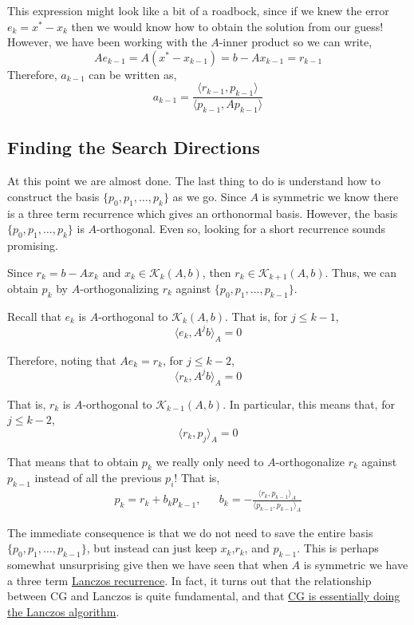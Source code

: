 \documentclass[10pt]{article}
\begin{document}
This expression might look like a bit of a roadbock, since if we knew the error \(e_k = x^* - x_k\) then we would know how to obtain the solution from our guess!
However, we have been working with the \(A\)-inner product so we can write,
\[
Ae_{k-1} = A(x^* - x_{k-1}) = b - Ax_{k-1} = r_{k-1}
\]
Therefore, \(a_{k-1}\) can be written as,
\[
a_{k-1}
= \frac{\langle r_{k-1}, p_{k-1} \rangle}{\langle p_{k-1},A p_{k-1} \rangle} 
\]

\subsection{Finding the Search Directions}

At this point we are almost done.
The last thing to do is understand how to construct the basis \(\{p_0,p_1,\ldots,p_k\}\) as we go.
Since \(A\) is symmetric we know there is a three term recurrence which gives an orthonormal basis. However, the basis \(\{p_0,p_1,\ldots,p_k\}\) is \(A\)-orthogonal.
Even so, looking for a short recurrence sounds promising.

Since \(r_k = b-Ax_k\) and \(x_k\in\mathcal{K}_k(A,b)\), then \(r_k \in \mathcal{K}_{k+1}(A,b)\).
Thus, we can obtain \(p_k\) by \(A\)-orthogonalizing \(r_k\) against \(\{p_0,p_1,\ldots,p_{k-1}\}\).

Recall that \(e_k\) is \(A\)-orthogonal to \(\mathcal{K}_k(A,b)\).
That is, for \(j\leq k-1\),
\[
\langle e_k, A^j b \rangle_A = 0
\]

Therefore, noting that \(Ae_k = r_k\), for \(j\leq k-2\),
\[
\langle r_k, A^j b \rangle_A = 0
\]

That is, \(r_k\) is \(A\)-orthogonal to \(\mathcal{K}_{k-1}(A,b)\).
In particular, this means that, for \(j\leq k-2\),
\[
\langle r_k, p_j \rangle_A = 0
\]

That means that to obtain \(p_k\) we really only need to \(A\)-orthogonalize \(r_k\) against \(p_{k-1}\) instead of all the previous \(p_i\)! That is,
\begin{align*}
p_k = r_k + b_k p_{k-1}
,&&
b_k = - \frac{\langle r_k, p_{k-1} \rangle_A}{\langle p_{k-1}, p_{k-1} \rangle_A}
\end{align*}

The immediate consequence is that we do not need to save the entire basis \(\{p_0,p_1,\ldots,p_{k-1}\}\), but instead can just keep \(x_k\),\(r_k\), and \(p_{k-1}\).
This is perhaps somewhat unsurprising give then we have seen that when \(A\) is symmetric we have a three term \href{./arnoldi_lanczos.html\#the-lanczos-algorithm}{Lanczos recurrence}.
In fact, it turns out that the relationship between CG and Lanczos is quite fundamental, and that \href{./cg_lanczos.html}{CG is essentially doing the Lanczos algorithm}.
\end{document}
